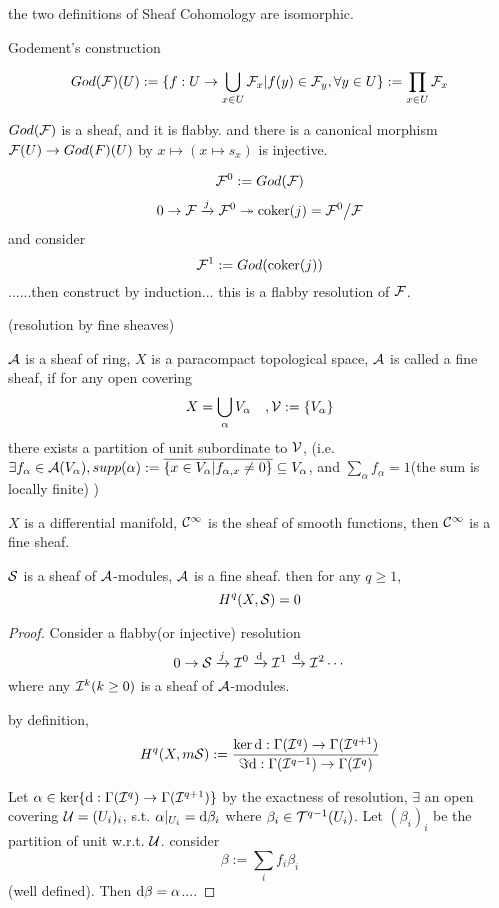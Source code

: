 the two definitions of Sheaf Cohomology are isomorphic.


Godement's construction

$$God(\mathcal{F})(U):=
\{f:U\to\bigcup_{x\in U}\mathcal{F}_x|
f(y)\in\mathcal{F}_y,\forall y\in U\}
:=\prod_{x\in U}\mathcal{F}_x$$

$God(\mathcal{F})$ is a sheaf, and it is flabby. and there is a canonical
morphism $\mathcal{F}(U)\to God(F)(U)$ by $x\mapsto(x\mapsto s_x)$ is injective.

$$\mathcal{F}^0:=God(\mathcal{F})$$
$$0\to\mathcal{F}\xrightarrow{j}\mathcal{F}^0\twoheadrightarrow\operatorname{coker}(j)=\mathcal{F}^0\big/\mathcal{F}$$
and consider
$$\mathcal{F}^1:=God(\operatorname{coker}(j))$$
......then construct by induction... this is a flabby resolution of $\mathcal{F}$.

\begin{definition}(resolution by fine sheaves)

$\mathcal{A}$ is a sheaf of ring,
$X$ is a paracompact topological space, $\mathcal{A}$
is called a fine sheaf, if for any open covering
$$X=\bigcup_{\alpha}V_{\alpha}\quad,\mathcal{V}:=\{V_{\alpha}\}$$
there exists a partition of unit subordinate to $\mathcal{V}$,
(i.e. $\exists f_{\alpha}\in\mathcal{A}(V_{\alpha}),supp(\alpha)
:=\overline{\{x\in V_{\alpha}|f_{\alpha,x}\neq 0\}}\subseteq V_{\alpha}$, and
$\sum_{\alpha}f_{\alpha}=1$(the sum is locally finite)
 )
\end{definition}

\begin{example}
$X$ is a differential manifold,
$\mathcal{C}^{\infty}$ is the sheaf of smooth functions,
then $\mathcal{C}^{\infty}$ is a fine sheaf.
\end{example}

\begin{thm}
$\mathcal{S}$ is a sheaf of $\mathcal{A}$-modules,
$\mathcal{A}$ is a fine sheaf. then for any $q\geq 1$,
$$H^q(X,\mathcal{S})=0$$
\end{thm}
\begin{proof}
Consider a flabby(or injective) resolution
$$0\to\mathcal{S}\xrightarrow{j}\mathcal{I}^0\xrightarrow{\mathrm{d}}\mathcal{I}^1\xrightarrow{\mathrm{d}}\mathcal{I}^2\cdots$$
where any $\mathcal{I}^k(k\geq 0)$ is a sheaf of $\mathcal{A}$-modules.

by definition,
$$H^q(X,m\mathcal{S}):=\frac{\ker\mathrm{d}:\Gamma(\mathcal{I}^q)\to\Gamma(\mathcal{I}^{q+1})}
                       {\Im\mathrm{d}:\Gamma(\mathcal{I}^{q-1})\to\Gamma(\mathcal{I}^{q})}$$

Let $\alpha\in\ker\{\mathrm{d}:\Gamma(\mathcal{I}^q)\to\Gamma(\mathcal{I}^{q+1})\}$
by the exactness of resolution, $\exists$ an open covering $\mathcal{U}=(U_{i})_{i}$,
s.t. $\alpha|_{U_{i}}=\mathrm{d}\beta_{i}$
where $\beta_{i}\in\mathcal{T}^{q-1}(U_{i})$.
Let $(\beta_{i})_{i}$ be the partition of unit w.r.t. $\mathcal{U}$.
consider
$$\beta:=\sum_{i}f_i\beta_i$$
(well defined). Then $\mathrm{d}\beta=\alpha$....
\end{proof}

